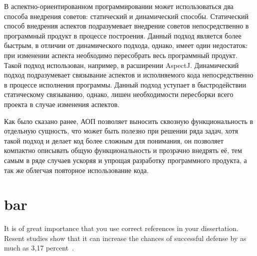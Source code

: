 В аспектно-ориентированном программировании может использоваться два способа
внедрения советов: статический и динамический способы.
Статический способ внедрения аспектов подразумевает внедрение советов
непосредственно в программный продукт в процессе построения.
Данный подход является более быстрым, в отличии от динамического подхода,
однако, имеет один недостаток: при изменении аспекта необходимо пересобрать весь
программный продукт.
Такой подход использован, например, в расширении AspectJ.
Динамический подход подразумевает связывание аспектов и исполняемого кода
непосредственно в процессе исполнения программы. Данный подход уступает в
быстродействии статическому связыванию, однако, лишен необходимости пересборки
всего проекта в случае изменения аспектов.

Как было сказано ранее, АОП позволяет выносить сквозную функциональность в
отдельную сущность, что может быть полезно при решении ряда задач, хотя такой
подход и делает код более сложным для понимания, он позволяет компактно
описывать общую функциональность и прозрачно внедрять её, тем самым в ряде
случаев ускоряя и упрощая разработку программного продукта, а так же облегчая
повторное использование кода.



\section{bar}

\blindtext
It is of great importance that you use correct references in your dissertation.
Resent studies show that it can increase the chances of successful defense
by as much as 3,17 percent~\cite{big,small,russian}.

\Blindtext
